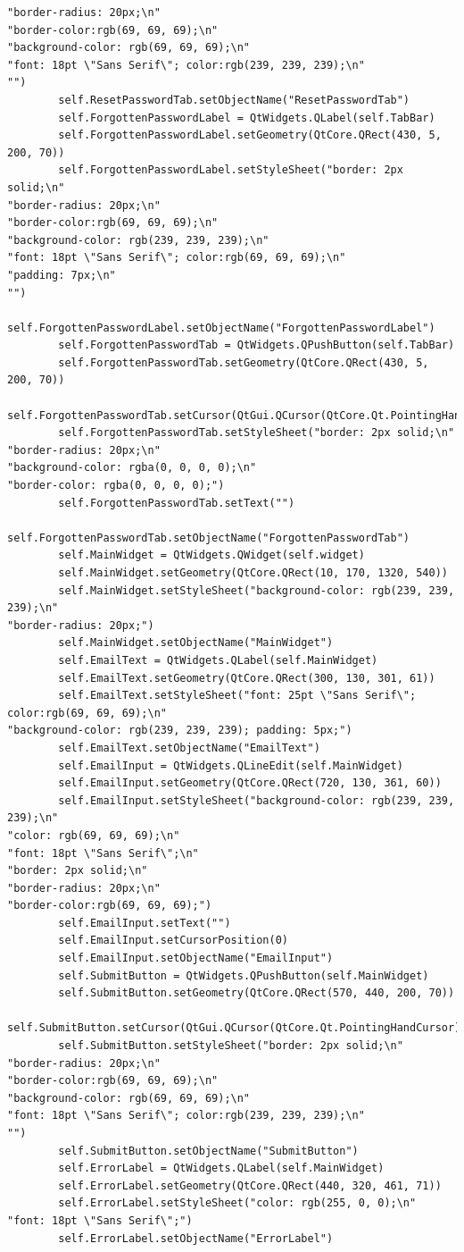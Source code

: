 \documentclass[12pt]{article}
\begin{document}
\begin{lstlisting}
"border-radius: 20px;\n"
"border-color:rgb(69, 69, 69);\n"
"background-color: rgb(69, 69, 69);\n"
"font: 18pt \"Sans Serif\"; color:rgb(239, 239, 239);\n"
"")
        self.ResetPasswordTab.setObjectName("ResetPasswordTab")
        self.ForgottenPasswordLabel = QtWidgets.QLabel(self.TabBar)
        self.ForgottenPasswordLabel.setGeometry(QtCore.QRect(430, 5, 200, 70))
        self.ForgottenPasswordLabel.setStyleSheet("border: 2px solid;\n"
"border-radius: 20px;\n"
"border-color:rgb(69, 69, 69);\n"
"background-color: rgb(239, 239, 239);\n"
"font: 18pt \"Sans Serif\"; color:rgb(69, 69, 69);\n"
"padding: 7px;\n"
"")
        self.ForgottenPasswordLabel.setObjectName("ForgottenPasswordLabel")
        self.ForgottenPasswordTab = QtWidgets.QPushButton(self.TabBar)
        self.ForgottenPasswordTab.setGeometry(QtCore.QRect(430, 5, 200, 70))
        self.ForgottenPasswordTab.setCursor(QtGui.QCursor(QtCore.Qt.PointingHandCursor))
        self.ForgottenPasswordTab.setStyleSheet("border: 2px solid;\n"
"border-radius: 20px;\n"
"background-color: rgba(0, 0, 0, 0);\n"
"border-color: rgba(0, 0, 0, 0);")
        self.ForgottenPasswordTab.setText("")
        self.ForgottenPasswordTab.setObjectName("ForgottenPasswordTab")
        self.MainWidget = QtWidgets.QWidget(self.widget)
        self.MainWidget.setGeometry(QtCore.QRect(10, 170, 1320, 540))
        self.MainWidget.setStyleSheet("background-color: rgb(239, 239, 239);\n"
"border-radius: 20px;")
        self.MainWidget.setObjectName("MainWidget")
        self.EmailText = QtWidgets.QLabel(self.MainWidget)
        self.EmailText.setGeometry(QtCore.QRect(300, 130, 301, 61))
        self.EmailText.setStyleSheet("font: 25pt \"Sans Serif\"; color:rgb(69, 69, 69);\n"
"background-color: rgb(239, 239, 239); padding: 5px;")
        self.EmailText.setObjectName("EmailText")
        self.EmailInput = QtWidgets.QLineEdit(self.MainWidget)
        self.EmailInput.setGeometry(QtCore.QRect(720, 130, 361, 60))
        self.EmailInput.setStyleSheet("background-color: rgb(239, 239, 239);\n"
"color: rgb(69, 69, 69);\n"
"font: 18pt \"Sans Serif\";\n"
"border: 2px solid;\n"
"border-radius: 20px;\n"
"border-color:rgb(69, 69, 69);")
        self.EmailInput.setText("")
        self.EmailInput.setCursorPosition(0)
        self.EmailInput.setObjectName("EmailInput")
        self.SubmitButton = QtWidgets.QPushButton(self.MainWidget)
        self.SubmitButton.setGeometry(QtCore.QRect(570, 440, 200, 70))
        self.SubmitButton.setCursor(QtGui.QCursor(QtCore.Qt.PointingHandCursor))
        self.SubmitButton.setStyleSheet("border: 2px solid;\n"
"border-radius: 20px;\n"
"border-color:rgb(69, 69, 69);\n"
"background-color: rgb(69, 69, 69);\n"
"font: 18pt \"Sans Serif\"; color:rgb(239, 239, 239);\n"
"")
        self.SubmitButton.setObjectName("SubmitButton")
        self.ErrorLabel = QtWidgets.QLabel(self.MainWidget)
        self.ErrorLabel.setGeometry(QtCore.QRect(440, 320, 461, 71))
        self.ErrorLabel.setStyleSheet("color: rgb(255, 0, 0);\n"
"font: 18pt \"Sans Serif\";")
        self.ErrorLabel.setObjectName("ErrorLabel")


\end{lstlisting}
\end{document}
